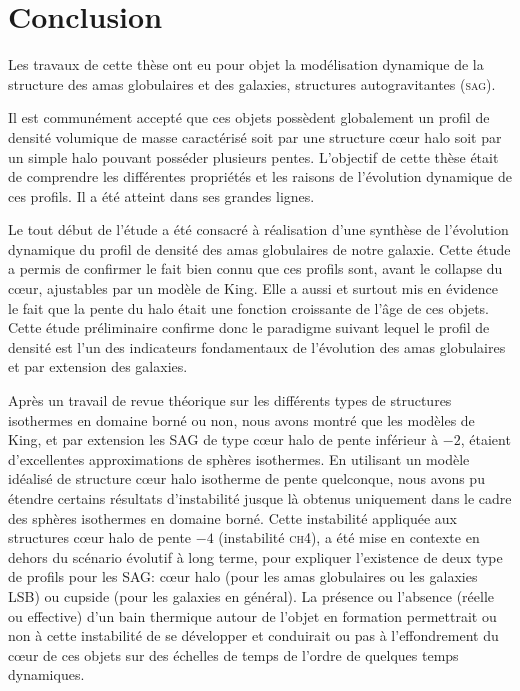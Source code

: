 \section{Conclusion}

Les travaux de cette thèse ont eu pour objet la modélisation dynamique de la structure des amas globulaires et des galaxies, structures
autogravitantes (\textsc{sag}). 



Il est communément accepté que ces objets possèdent globalement un profil de densité volumique de masse caractérisé soit par une structure cœur halo
soit par un simple halo pouvant posséder plusieurs pentes. L'objectif de cette thèse était de comprendre les différentes propriétés et les raisons de
l'évolution dynamique de ces profils. Il a été atteint dans ses grandes lignes.



Le tout début de l'étude a été consacré à réalisation d'une synthèse de l'évolution dynamique du profil de densité des amas globulaires de notre
galaxie. Cette étude a permis de confirmer le fait bien connu que ces profils sont, avant le collapse du cœur, ajustables par un modèle de King. Elle
a aussi et surtout mis en évidence le fait que la pente du halo était une fonction croissante de l'âge de ces objets. Cette étude préliminaire
confirme donc le paradigme suivant lequel le profil de densité est l'un des indicateurs fondamentaux de l'évolution des amas globulaires et par
extension des galaxies.


Après un travail de revue théorique sur les différents types de structures isothermes en domaine borné ou non, nous avons montré que les modèles de
King, et par extension les \textsc{SAG} de type cœur halo de pente inférieur à $-2$, étaient d'excellentes approximations de sphères isothermes. En
utilisant un modèle idéalisé de structure cœur halo isotherme de pente quelconque, nous avons pu étendre certains résultats d'instabilité jusque là
obtenus uniquement dans le cadre des sphères isothermes en domaine borné. Cette instabilité appliquée aux structures cœur halo de pente $-4$
(instabilité \textsc{ch4}), a été mise en contexte  en dehors du scénario évolutif à long terme, pour expliquer l'existence de deux type de profils
pour les \textsc{SAG}: cœur halo (pour les amas globulaires ou les galaxies LSB) ou cupside (pour les galaxies en général). La présence ou l'absence
(réelle ou effective) d'un bain thermique autour de l'objet en formation permettrait ou non à cette instabilité de se développer et conduirait ou pas
à l'effondrement du cœur de ces objets sur des échelles de temps de l'ordre de quelques temps dynamiques.



